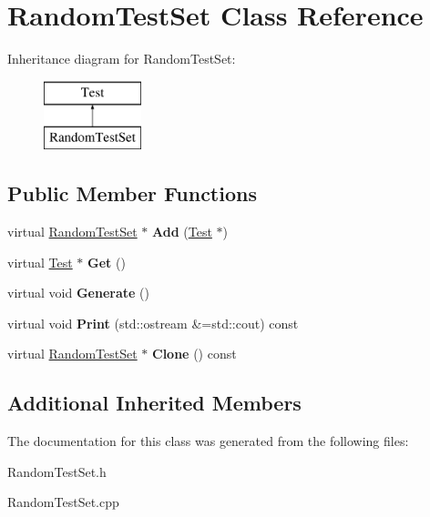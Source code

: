 \hypertarget{class_random_test_set}{}\section{Random\+Test\+Set Class Reference}
\label{class_random_test_set}
Inheritance diagram for Random\+Test\+Set\+:\begin{figure}[H]
\begin{center}
\leavevmode
\includegraphics[height=2.000000cm]{class_random_test_set}
\end{center}
\end{figure}
\subsection*{Public Member Functions}
\begin{DoxyCompactItemize}
\item 
\mbox{\label{class_random_test_set_a9857bd26593f8c9619946437670e8508}} 
virtual \hyperlink{class_random_test_set}{Random\+Test\+Set} $\ast$ {\bfseries Add} (\hyperlink{class_test}{Test} $\ast$)
\item 
\mbox{\label{class_random_test_set_aa112670e8e1096950d064d273fe0813b}} 
virtual \hyperlink{class_test}{Test} $\ast$ {\bfseries Get} ()
\item 
\mbox{\label{class_random_test_set_a8ae5ba47a55c8aa4b12d045315e43a7f}} 
virtual void {\bfseries Generate} ()
\item 
\mbox{\label{class_random_test_set_a50dea8180a7ac0f2e7336f21b88b7f70}} 
virtual void {\bfseries Print} (std\+::ostream \&=std\+::cout) const
\item 
\mbox{\label{class_random_test_set_a2a90e27b75bf2896131a9922c4afb2ed}} 
virtual \hyperlink{class_random_test_set}{Random\+Test\+Set} $\ast$ {\bfseries Clone} () const
\end{DoxyCompactItemize}
\subsection*{Additional Inherited Members}


The documentation for this class was generated from the following files\+:\begin{DoxyCompactItemize}
\item 
Random\+Test\+Set.\+h\item 
Random\+Test\+Set.\+cpp\end{DoxyCompactItemize}
